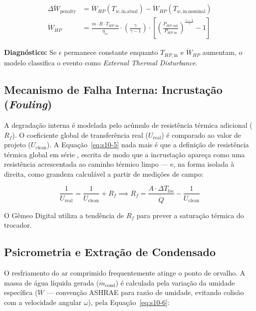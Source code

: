 \documentclass[12pt,a4paper]{article}
\numberwithin{equation}{section}
\numberwithin{table}{section}
\numberwithin{figure}{section}
\begin{document}
	\begin{equation}\label{eq:s10-4}
	\begin{aligned}
		\Delta \dot{W}_{\text{penalty}} &= \dot{W}_{HP}(T_{w,\text{in,atual}}) - \dot{W}_{HP}(T_{w,\text{in,nominal}}) \\[4pt]
		\dot{W}_{HP} &= \frac{\dot{m} \cdot R \cdot T_{HP,\text{in}}}{\eta_{is}} \cdot \left( \frac{\gamma}{\gamma-1} \right) \cdot \left[ \left( \frac{P_{HP,\text{out}}}{P_{HP,\text{in}}} \right)^{\frac{\gamma-1}{\gamma}} - 1 \right]
	\end{aligned}
\end{equation}
	
	\textbf{Diagnóstico:} Se $\epsilon$ permanece constante enquanto $T_{HP,\text{in}}$ e $\dot{W}_{HP}$ aumentam, o modelo classifica o evento como \textit{External Thermal Disturbance}.
	
	\subsection{\textbf{Mecanismo de Falha Interna: Incrustação (\textit{Fouling})}}
	A degradação interna é modelada pelo acúmulo de resistência térmica adicional ($R_f$). O coeficiente global de transferência real ($U_{\text{real}}$) é comparado ao valor de projeto ($U_{\text{clean}}$). A Equação~\eqref{eq:s10-5} nada mais é que a definição de resistência térmica global em série \cite[Cap.~11]{incropera}, escrita de modo que a incrustação apareça como uma resistência acrescentada ao caminho térmico limpo — e, na forma isolada à direita, como grandeza calculável a partir de medições de campo:
	
	\begin{equation}\label{eq:s10-5}
	\frac{1}{U_{\text{real}}} = \frac{1}{U_{\text{clean}}} + R_f \implies R_f = \frac{A \cdot \Delta T_{lm}}{\dot{Q}} - \frac{1}{U_{\text{clean}}}
\end{equation}
	
	O Gêmeo Digital utiliza a tendência de $R_f$ para prever a saturação térmica do trocador.
	
	\subsection{\textbf{Psicrometria e Extração de Condensado}}
	O resfriamento do ar comprimido frequentemente atinge o ponto de orvalho. A massa de água líquida gerada ($\dot{m}_{\text{cond}}$) é calculada pela variação da umidade específica ($W$ — convenção ASHRAE \cite{ashrae} para razão de umidade, evitando colisão com a velocidade angular $\omega$), pela Equação~\eqref{eq:s10-6}:
\end{document}
